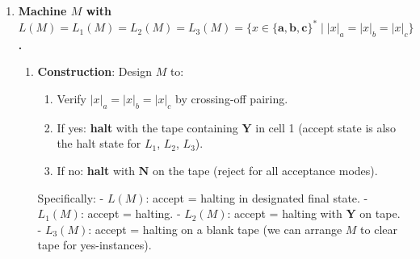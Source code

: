 \begin{enumerate}[{11.}1. ]
\begin{enumerate}
Strategy: Count $|x|_a$, $|x|_b$, $|x|_c$ separately and verify $|x|_a \neq |x|_b$ and $|x|_b \neq |x|_c$.

A practical approach:
\begin{enumerate}[1.]
\item Verify the input has the form $\pmb{a}^k\pmb{b}^n\pmb{c}^m$ (check symbol ordering); reject if not.
\item Pair off $\pmb{a}$s and $\pmb{b}$s: erase one $\pmb{a}$ and one $\pmb{b}$ in each pass. If they run out simultaneously, $k=n$; reject.
\item Pair off $\pmb{b}$s and $\pmb{c}$s similarly. If they run out simultaneously, $n=m$; reject.
\item If both checks show inequality, accept.
\end{enumerate}

\item $\{x \mid |x|_a \neq |x|_b \wedge |x|_b \neq |x|_c\}$ (arbitrary mixing):

Strategy: Count occurrences by marking symbols.
\begin{enumerate}[1.]
\item In pass 1: pair $\pmb{a}$s with $\pmb{b}$s by crossing out one of each per scan. If the pairing runs out on one side before the other, $|x|_a \neq |x|_b$ confirmed. If they balance, $|x|_a = |x|_b$; reject.
\item In pass 2: pair $\pmb{b}$s with $\pmb{c}$s. Similarly check $|x|_b \neq |x|_c$.
\item Accept iff both checks confirm inequality.
\end{enumerate}
\end{enumerate}

\item \textbf{Machine $M$ with $L(M)=L_1(M)=L_2(M)=L_3(M)=\{x\in\{\pmb{a},\pmb{b},\pmb{c}\}^*\mid |x|_a=|x|_b=|x|_c\}$.}

\begin{enumerate}
\item \textbf{Construction}: Design $M$ to:
\begin{enumerate}[1.]
\item Verify $|x|_a = |x|_b = |x|_c$ by crossing-off pairing.
\item If yes: \textbf{halt} with the tape containing $\pmb{Y}$ in cell 1 (accept state is also the halt state for $L_1$, $L_2$, $L_3$).
\item If no: \textbf{halt} with $\pmb{N}$ on the tape (reject for all acceptance modes).
\end{enumerate}
Specifically:
- $L(M)$: accept = halting in designated final state.
- $L_1(M)$: accept = halting.
- $L_2(M)$: accept = halting with $\pmb{Y}$ on tape.
- $L_3(M)$: accept = halting on a blank tape (we can arrange $M$ to clear tape for yes-instances).


\end{enumerate}
\end{enumerate}
